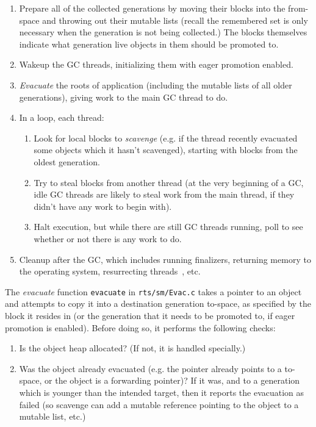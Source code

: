 \begin{enumerate}
    \item Prepare all of the collected generations by moving their blocks
        into the from-space and throwing out their mutable lists (recall the remembered
        set is only necessary when the generation is not being collected.)
        The blocks themselves indicate what generation live objects in them should be promoted to.
    \item Wakeup the GC threads, initializing them with eager promotion enabled.
    \item \emph{Evacuate} the roots of application (including the mutable lists of all older generations), giving work to the main GC thread to do.
    \item In a loop, each thread:
        \begin{enumerate}
            \item Look for local blocks to \emph{scavenge} (e.g. if the thread recently evacuated some objects which it hasn't scavenged), starting with blocks from the oldest generation.
            \item Try to steal blocks from another thread (at the very beginning of a GC, idle GC threads are likely to steal work from the main thread, if they didn't have any work to begin with).
            \item Halt execution, but while there are still GC threads running, poll to see whether or not there is any work to do.
        \end{enumerate}
    \item Cleanup after the GC, which includes running finalizers, returning memory to the operating system, resurrecting threads~\XXX, etc.
\end{enumerate}

The \emph{evacuate} function \verb|evacuate| in \verb|rts/sm/Evac.c|
takes a pointer to an object and attempts to copy it into a destination
generation to-space, as specified by the block it resides in (or the generation that
it needs to be promoted to, if eager promotion is enabled).  Before doing so,
it performs the following checks:

\begin{enumerate}
    \item Is the object heap allocated? (If not, it is handled specially.)
    \item Was the object already evacuated (e.g. the pointer already points
        to a to-space, or the object is a forwarding pointer)?  If it
        was, and to a generation which is younger than the intended
        target, then it reports the evacuation as failed (so scavenge
        can add a mutable reference pointing to the object to a mutable
        list, etc.)
\end{enumerate}

